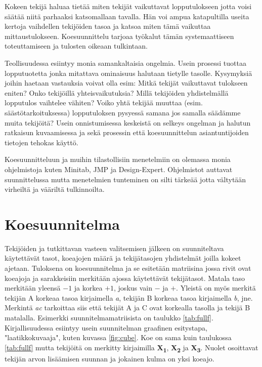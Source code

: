 \documentclass[12pt,a4paper,finnish]{tutthesis}
\begin{document}
Kokeen tekijä haluaa tietää miten tekijät vaikuttavat lopputulokseen jotta voisi
säätää niitä parhaaksi katsomallaan tavalla. Hän voi ampua katapultilla
useita kertoja vaihdellen
tekijöiden tasoa ja katsoa miten tämä vaikuttaa mittaustulokseen. Koesuunnittelu
tarjoaa työkalut tämän systemaattiseen toteuttamiseen ja tulosten oikeaan
tulkintaan.

Teollisuudessa esiintyy monia samankaltaisia ongelmia. Usein prosessi tuottaa
lopputuotetta jonka mitattava ominaisuus halutaan tietylle tasolle.
Kysymyksiä joihin haetaan vastauksia voivat olla esim: Mitkä tekijät vaikuttavat
tulokseen eniten? Onko tekijöillä yhteisvaikutuksia? Millä tekijöiden yhdistelmällä
lopputulos vaihtelee vähiten? Voiko yhtä tekijää muuttaa (esim. säästötarkoituksessa)
lopputuloksen pysyessä samana jos samalla säädämme muita tekijöitä?
Usein onnistumisessa keskeistä on selkeys ongelman ja halutun ratkaisun
kuvaamisessa ja sekä prosessin että koesuunnittelun asiantuntijoiden tietojen
tehokas käyttö.


Koesuunnitteluun ja muihin tilastollisiin menetelmiin on olemassa monia ohjelmistoja
kuten Minitab, JMP ja Design-Expert. Ohjelmistot auttavat suunnittelussa
mutta menetelmien tunteminen on silti tärkeää jotta vältytään virheiltä
ja vääriltä tulkinnoilta.

\section{Koesuunnitelma}
\label{doe}

Tekijöiden ja tutkittavan vasteen valitsemisen jälkeen on suunniteltava käytettävät
tasot, koeajojen määrä ja tekijätasojen yhdistelmät joilla kokeet ajetaan.
Tuloksena on koesuunnitelma ja se esitetään matriisina jossa rivit ovat
koeajoja ja sarakkeisiin merkitään ajossa käytettävät tekijätasot.
Matala taso merkitään yleensä $-1$ ja korkea $+1$, joskus vain $-$ ja $+$.
Yleistä on myös merkitä tekijän A korkeaa tasoa kirjaimella \textit{a}, tekijän
B korkeaa tasoa kirjaimella \textit{b}, jne. Merkintä \textit{ac} tarkoittaa siis
että
tekijät A ja C ovat korkealla tasolla ja tekijä B matalalla. Esimerkki
suunnitelmamatriisista on taulukko \ref{tab:fullf}.
Kirjallisuudessa esiintyy usein suunnitelman graafinen esitystapa,
"laatikkokuvaaja", kuten kuvassa \ref{fig:cube}.
Koe on sama kuin taulukossa \ref{tab:fullf} mutta tekijöitä on
merkitty kirjaimilla \textbf{X\textsubscript{1}}, \textbf{X\textsubscript{2}}
ja \textbf{X\textsubscript{3}}. Nuolet osoittavat tekijän arvon lisäämisen
suunnan ja jokainen kulma on yksi koeajo.
\end{document}
